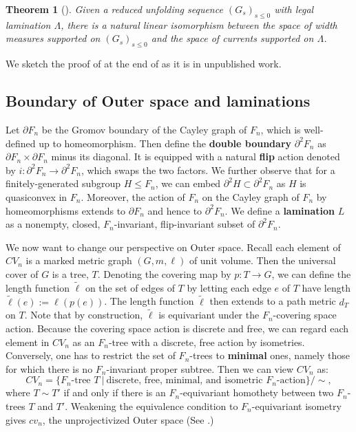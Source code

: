 \documentclass[11pt, letterpaper]{amsart}
\theoremstyle{plain}
\newtheorem{theorem}{Theorem}[section]
\theoremstyle{definition}
\newcommand{\wt}[1]{\widetilde{#1}}
\begin{document}
\begin{theorem}[{\cite[Theorem 4.4]{NPR2014}}] \label{thm:NPR-unfoldingsequence}
    Given a reduced unfolding sequence $(G_s)_{s \le 0}$ with legal lamination
    $\Lambda$, there is a natural linear isomorphism between the space of
    width measures supported on $(G_s)_{s \le 0}$ and the space of currents supported on $\Lambda$.
  \end{theorem}
  We sketch the proof of  at the end of  as it is in unpublished work. 

  
  
\subsection{Boundary of Outer space and laminations}
\label{ssec:boundaryCVn}

Let $\partial F_n$ be the Gromov boundary of the Cayley graph of $F_n$, which is
well-defined up to homeomorphism. Then define the \textbf{double boundary}
$\partial^2F_n$ as $\partial F_n \times \partial F_n$ minus its diagonal. It
is equipped with a natural \textbf{flip} action denoted by $i : \partial^2F_n \to
\partial^2F_n$, which swaps the two factors. We further observe that for a
finitely-generated subgroup $H \le F_n$, we can embed $\partial^2H \subset
\partial^2 F_n$ as $H$ is quasiconvex in $F_n$.
Moreover, the action of $F_n$ on the Cayley graph of $F_n$ by homeomorphisms
extends to $\partial F_n$ and hence to $\partial^2 F_n$. We define a
\textbf{lamination} $L$ as a nonempty, closed, $F_n$-invariant, flip-invariant
subset of $\partial^2F_n$.

We now want to change our perspective on Outer space. Recall
each element of $CV_n$ is a marked metric graph $(G, m, \ell)$ of unit volume. Then the
universal cover of $G$ is a tree, $T$. Denoting the covering map by $p:T \to G$,
we can define the length function $\wt{\ell}$ on the set of edges of $T$
by letting each edge $e$ of $T$ have length
$\wt{\ell}(e):=\ell(p(e))$. The length function $\wt{\ell}$ then extends to a path metric $d_T$ on $T$.
Note that by construction, $\wt{\ell}$ is equivariant under the $F_n$-covering space action. Because the covering space action is discrete and free, we can
regard each element in $CV_n$ as an $F_n$-tree with a discrete, free action by
isometries. Conversely, one has to restrict the set of $F_n$-trees to
\textbf{minimal} ones, namely those for which there is no $F_n$-invariant proper subtree. Then we can view $CV_n$ as:
\[
  CV_n = \{\text{$F_n$-tree } T\ |\ \text{discrete, free,
    minimal, and isometric $F_n$-action}\}/\sim,
\]
where $T \sim T'$ if and only if there is an $F_n$-equivariant homothety between
two $F_n$-trees
$T$ and $T'$. Weakening the equivalence condition to $F_n$-equivariant isometry
gives $cv_n$, the unprojectivized Outer space (See .)
\end{document}
